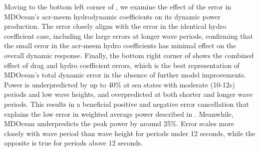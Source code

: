 Moving to the bottom left corner of , we examine the effect of the error in MDOcean's \gls{acr-meem} hydrodynamic coefficients on its dynamic power production.
The error closely aligns with the error in the identical hydro coefficient case, including the large errors at longer wave periods, confirming that the small error in the \gls{acr-meem} hydro coefficients has minimal effect on the overall dynamic response.
Finally, the bottom right corner of  shows the combined effect of drag and hydro coefficient errors, which is the best representation of MDOcean's total dynamic error in the absence of further model improvements.
Power is underpredicted by up to 40\% at sea states with moderate (10-12s) periods and low wave heights, and overpredicted at both shorter and longer wave periods.
This results in a beneficial positive and negative error cancellation that explains the low error in weighted average power described in .
Meanwhile, MDOcean underpredicts the peak power by around 25\%.
Error scales more closely with wave period than wave height for periods under 12 seconds, while the opposite is true for periods above 12 seconds.

